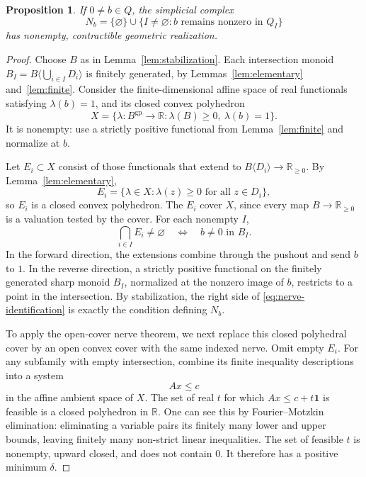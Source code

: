\documentclass[11pt]{article}
\newtheorem{proposition}[theorem]{Proposition}
\theoremstyle{definition}
\theoremstyle{remark}
\newcommand{\R}{\mathbb R}
\newcommand{\gp}{\mathrm{gp}}
\begin{document}
\begin{proposition}\label{prop:nerve}
If $0\neq b\in Q$, the simplicial complex
\[
 N_b=\{\varnothing\}\cup
 \{I\neq\varnothing:b\text{ remains nonzero in }Q_I\}
\]
has nonempty, contractible geometric realization.
\end{proposition}

\begin{proof}
Choose $B$ as in Lemma~\ref{lem:stabilization}. Each intersection monoid
$B_I=B\langle\bigcup_{i\in I}D_i\rangle$ is finitely generated, by Lemmas~\ref{lem:elementary} and~\ref{lem:finite}. Consider the finite-dimensional affine space of real functionals satisfying $\lambda(b)=1$, and its closed convex polyhedron
\[
 X=\{\lambda:B^{\gp}\to\R:\lambda(B)\geq0,\ \lambda(b)=1\}.
\]
It is nonempty: use a strictly positive functional from Lemma~\ref{lem:finite} and normalize at $b$.

Let $E_i\subset X$ consist of those functionals that extend to $B\langle D_i\rangle\to\R_{\geq0}$. By Lemma~\ref{lem:elementary},
\[
 E_i=\{\lambda\in X:\lambda(z)\geq0\text{ for all }z\in D_i\},
\]
so $E_i$ is a closed convex polyhedron. The $E_i$ cover $X$, since every map $B\to\R_{\geq0}$ is a valuation tested by the cover. For each nonempty $I$,
\begin{equation}\label{eq:nerve-identification}
 \bigcap_{i\in I}E_i\neq\varnothing
 \quad\Longleftrightarrow\quad b\neq0\text{ in }B_I.
\end{equation}
In the forward direction, the extensions combine through the pushout and send $b$ to $1$. In the reverse direction, a strictly positive functional on the finitely generated sharp monoid $B_I$, normalized at the nonzero image of $b$, restricts to a point in the intersection. By stabilization, the right side of \eqref{eq:nerve-identification} is exactly the condition defining $N_b$.

To apply the open-cover nerve theorem, we next replace this closed polyhedral cover by an open convex cover with the same indexed nerve. Omit empty $E_i$. For any subfamily with empty intersection, combine its finite inequality descriptions into a system
\[
 Ax\leq c
\]
in the affine ambient space of $X$. The set of real $t$ for which $Ax\leq c+t\mathbf1$ is feasible is a closed polyhedron in $\R$. One can see this by Fourier--Motzkin elimination: 
eliminating a variable pairs its finitely many lower and upper bounds, leaving finitely many non-strict linear inequalities. The set of feasible $t$ is nonempty, upward closed, and does not contain $0$. It therefore has a positive minimum $\delta$.


\end{proof}
\end{document}
